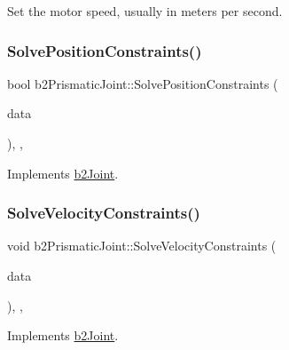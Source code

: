Set the motor speed, usually in meters per second. 

\mbox{\label{classb2_prismatic_joint_ac841608a56e83f709e08b805ed8c92e3}} 
\subsubsection{\texorpdfstring{SolvePositionConstraints()}{SolvePositionConstraints()}}
{\footnotesize\ttfamily bool b2\+Prismatic\+Joint\+::\+Solve\+Position\+Constraints (\begin{DoxyParamCaption}\item[{const \mbox{\hyperlink{structb2_solver_data}{b2\+Solver\+Data}} \&}]{data }\end{DoxyParamCaption})\hspace{0.3cm}{\ttfamily [override]}, {\ttfamily [protected]}, {\ttfamily [virtual]}}



Implements \mbox{\hyperlink{classb2_joint_af767ac9aa494bd15cdf83dfe3e487d9c}{b2\+Joint}}.

\mbox{\label{classb2_prismatic_joint_a028c0ca03ca8437606d1175ca8de63d6}} 
\subsubsection{\texorpdfstring{SolveVelocityConstraints()}{SolveVelocityConstraints()}}
{\footnotesize\ttfamily void b2\+Prismatic\+Joint\+::\+Solve\+Velocity\+Constraints (\begin{DoxyParamCaption}\item[{const \mbox{\hyperlink{structb2_solver_data}{b2\+Solver\+Data}} \&}]{data }\end{DoxyParamCaption})\hspace{0.3cm}{\ttfamily [override]}, {\ttfamily [protected]}, {\ttfamily [virtual]}}



Implements \mbox{\hyperlink{classb2_joint_ad302c8d02efcfe934158de0dc429348d}{b2\+Joint}}.



